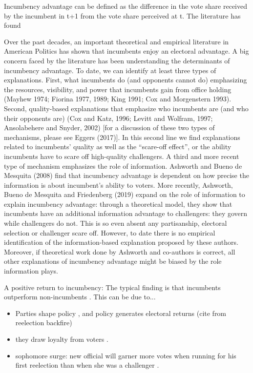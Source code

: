 \documentclass[12pt]{amsart}
\makeatletter
\def\section{\@startsection{section}{1}
	\z@{1.0\linespacing\@plus\linespacing}{.5\linespacing}{\Large}}
\numberwithin{equation}{section}
\theoremstyle{definition}
\theoremstyle{definition}
\theoremstyle{definition}
\makeatother
\begin{document}
\clearpage


\section{Incumbency advantage}
Incumbency advantage can be defined as the difference in the vote share received by the incumbent in t+1 from the vote share perceived at t. The literature has found 

Over the past decades, an important theoretical and empirical literature in American Politics has shown that incumbents enjoy an electoral advantage. A big concern faced by the literature has been understanding the determinants of incumbency advantage. To date, we can identify at least three types of explanations.  First, what incumbents do (and opponents cannot do) emphasizing the resources, visibility, and power that incumbents gain from office holding (Mayhew 1974; Fiorina 1977, 1989; King 1991; Cox and Morgenstern 1993). Second, quality-based explanations that emphasize who incumbents are (and who their opponents are) (Cox and Katz, 1996; Levitt and Wolfram, 1997; Ansolabehere and Snyder, 2002) [for a discussion of these two types of mechanisms, please see Eggers (2017)]. In this second line we find explanations related to incumbents’ quality as well as the “scare-off effect”, or the ability incumbents have to scare off high-quality challengers. A third and more recent type of mechanism emphasizes the role of information. Ashworth and Bueno de Mesquita (2008) find that incumbency advantage is dependent on how precise the information is about incumbent’s ability to voters. More recently, Ashworth, Bueno de Mesquita and Friedenberg (2019) expand on the role of information to explain incumbency advantage: through a theoretical model, they show that incumbents have an additional information advantage to challengers: they govern while challengers do not. This is so even absent any partisanship, electoral selection or challenger scare off. However, to date there is no empirical identification of the information-based explanation proposed by these authors. Moreover, if theoretical work done by Ashworth and co-authors is correct, all other explanations of incumbency advantage might be biased by the role information plays. 

A positive return to incumbency:
The typical finding is that incumbents outperform non-incumbents \citep{gelman_king_1990, cox_morgensten_1993, ansolabehere_snyder_2000, hirano_snyder_2009}. This can be due to...
\begin{itemize}
	\item Parties shape policy \citep{cox_mccubins_1993, cox_mccubins_2006}, and policy generates electoral returns (cite from reelection backfire) 
	\item they draw loyalty from voters \citep{campbell_etal_1960, green_etal_2002}. 
	\item sophomore surge: new official will garner more votes when running for his first reelection than when she was a challenger \citep{erikson_1971, alford_brady_1989}.
\end{itemize}
\end{document}
